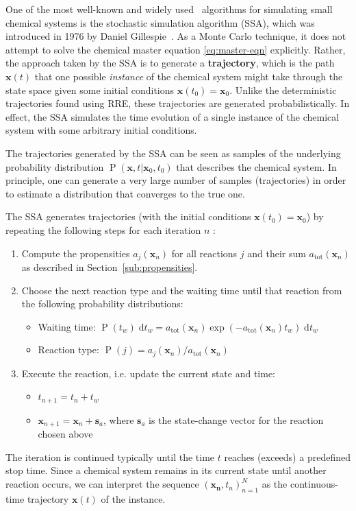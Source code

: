 \documentclass[english,letterpaper,12pt]{report}
\newcommand{\defkeywd}[1]{\textbf{#1}}
\newcommand{\dee}{\;\mathrm{d}}
\renewcommand{\vec}[1]{\ensuremath{\mathbf{#1}}}
\DeclareMathOperator{\Prob}{P}
\begin{document}
\begin{doublespacing}
One of the most well-known and widely used~\cite{gillespie-ssa}\cite{we-chemkin}\cite{stoch-sys-bio} algorithms for simulating small chemical systems is the stochastic simulation algorithm (SSA), which was introduced in 1976 by Daniel Gillespie~\cite{gillespie-1976}. As a Monte Carlo technique, it does not attempt to solve the chemical master equation \eqref{eq:master-eqn} explicitly. Rather, the approach taken by the SSA is to generate a \defkeywd{trajectory}, which is the path $\vec{x}(t)$ that one possible \emph{instance} of the chemical system might take through the state space given some initial conditions $\vec{x}(t_0) = \vec{x}_0$. Unlike the deterministic trajectories found using RRE, these trajectories are generated probabilistically. In effect, the SSA simulates the time evolution of a single instance of the chemical system with some arbitrary initial conditions.

The trajectories generated by the SSA can be seen as samples of the underlying probability distribution $\Prob(\vec{x}, t | \vec{x}_0, t_0)$ that describes the chemical system. In principle, one can generate a very large number of samples (trajectories) in order to estimate a distribution that converges to the true one.

The SSA generates trajectories (with the initial conditions $\vec{x}(t_0) = \vec{x}_0$) by repeating the following steps for each iteration $n$ \cite{gillespie-ssa}:
\begin{enumerate}
    \item Compute the propensities $a_j(\vec{x}_n)$ for all reactions $j$ and their sum $a_\text{tot}(\vec{x}_n)$ as described in Section~\ref{sub:propensities}.
    \item Choose the next reaction type and the waiting time until that reaction from the following probability distributions:
    \begin{itemize}
        \item Waiting time: $\Prob(t_w)\dee t_w = a_\text{tot}(\vec{x}_n) \exp(-a_\text{tot}(\vec{x}_n) t_w) \dee t_w$
        \item Reaction type: $\Prob(j) = a_j(\vec{x}_n) / a_\text{tot}(\vec{x}_n)$
    \end{itemize}
    \item Execute the reaction, i.e. update the current state and time:
    \begin{itemize}
        \item $t_{n+1} = t_n + t_w$
        \item $\vec{x}_{n+1} = \vec{x}_n + \vec{s}_a$, where $\vec{s}_a$ is the state-change vector for the reaction chosen above
    \end{itemize}
\end{enumerate}
The iteration is continued typically until the time $t$ reaches (exceeds) a predefined stop time. Since a chemical system remains in its current state until another reaction occurs, we can interpret the sequence $\left(\vec{x_n}, t_n\right)_{n=1}^N$ as the continuous-time trajectory $\vec{x}(t)$ of the instance.


\end{doublespacing}
\end{document}
